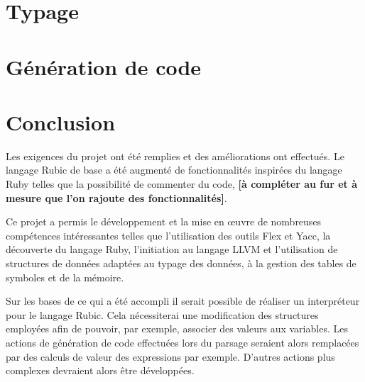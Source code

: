 \documentclass[12pt]{article}
\begin{document}
\section{Typage}

\section{Génération de code}

\section{Conclusion}

Les exigences du projet ont été remplies et des améliorations ont effectués.
Le langage Rubic de base a été augmenté de fonctionnalités inspirées du
langage Ruby telles que la possibilité de commenter du code, \textbf{[à compléter au
fur et à mesure que l'on rajoute des fonctionnalités]}.

Ce projet a permis le développement et la mise en œuvre de nombreuses
compétences intéressantes telles que l'utilisation des outils Flex et Yacc, la
découverte du langage Ruby, l'initiation au langage LLVM et l'utilisation de
structures de données adaptées au typage des données, à la gestion des tables
de symboles et de la mémoire.

Sur les bases de ce qui a été accompli il serait possible de réaliser un
interpréteur pour le langage Rubic. Cela nécessiterai une modification des
structures employées afin de pouvoir, par exemple, associer des valeurs aux
variables. Les actions de génération de code effectuées lors du parsage
seraient alors remplacées par des calculs de valeur des expressions par
exemple. D'autres actions plus complexes devraient alors être développées.
\end{document}
